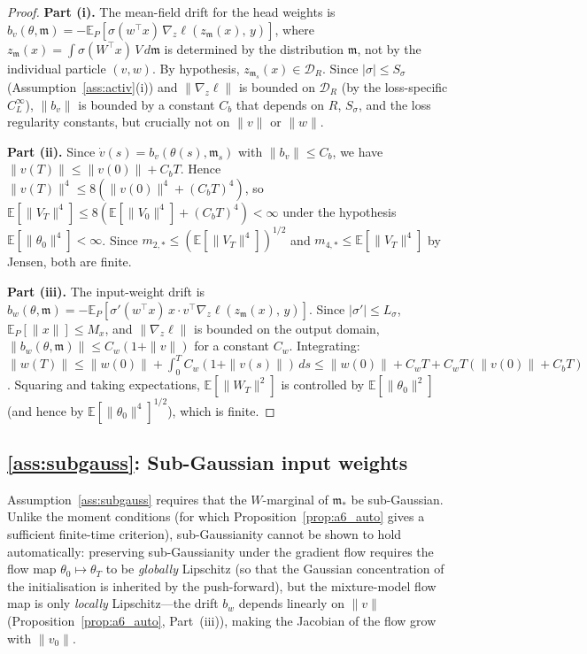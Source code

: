 \documentclass[11pt]{article}
\newcommand{\E}{\mathbb{E}}
\newcommand{\cB}{\mathcal{B}}
\newcommand{\cD}{\mathcal{D}}  %
\begin{document}
\begin{proof}
\textbf{Part (i).}
The mean-field drift for the head weights is
$b_v(\theta, \mathfrak{m})
= -\E_P[\sigma(w^\top x)\,\nabla_z \ell(z_\mathfrak{m}(x),\, y)]$,
where $z_\mathfrak{m}(x) = \int \sigma(W^\top x)\,V\,d\mathfrak{m}$
is determined by the distribution $\mathfrak{m}$, not by the
individual particle $(v,w)$.
By hypothesis, $z_{\mathfrak{m}_s}(x) \in \cD_R$.
Since $|\sigma| \le S_\sigma$ (Assumption~\ref{ass:activ}(i)) and
$\|\nabla_z \ell\|$ is bounded on $\cD_R$
(by the loss-specific $C_L^\infty$),
$\|b_v\|$ is bounded by a constant $C_b$ that depends on
$R$, $S_\sigma$, and the loss regularity constants, but crucially not on
$\|v\|$ or $\|w\|$.

\textbf{Part (ii).}
Since $\dot v(s) = b_v(\theta(s), \mathfrak{m}_s)$ with
$\|b_v\| \le C_b$, we have
$\|v(T)\| \le \|v(0)\| + C_b T$.
Hence
$\|v(T)\|^4 \le 8(\|v(0)\|^4 + (C_b T)^4)$, so
$\E[\|V_T\|^4] \le 8(\E[\|V_0\|^4] + (C_b T)^4) < \infty$
under the hypothesis $\E[\|\theta_0\|^4] < \infty$.
Since $m_{2,*} \le (\E[\|V_T\|^4])^{1/2}$ and
$m_{4,*} \le \E[\|V_T\|^4]$ by Jensen, both are finite.

\textbf{Part (iii).}
The input-weight drift is
$b_w(\theta, \mathfrak{m})
= -\E_P[\sigma'(w^\top x)\,x\cdot
  v^\top\nabla_z \ell(z_\mathfrak{m}(x),\,y)]$.
Since $|\sigma'| \le L_\sigma$, $\E_P[\|x\|] \le M_x$, and
$\|\nabla_z \ell\|$ is bounded on the output domain,
$\|b_w(\theta, \mathfrak{m})\| \le C_w(1 + \|v\|)$
for a constant $C_w$.
Integrating:
$\|w(T)\| \le \|w(0)\| + \int_0^T C_w(1 + \|v(s)\|)\,ds
\le \|w(0)\| + C_w T + C_w T(\|v(0)\| + C_b T)$.
Squaring and taking expectations,
$\E[\|W_T\|^2]$ is controlled by $\E[\|\theta_0\|^2]$
(and hence by $\E[\|\theta_0\|^4]^{1/2}$), which is finite.
\end{proof}

\subsection{\ref{ass:subgauss}: Sub-Gaussian input weights}\label{app:a7_validation}

Assumption~\ref{ass:subgauss} requires that the $W$-marginal of
$\mathfrak{m}_*$ be sub-Gaussian.
Unlike the moment conditions (for which
Proposition~\ref{prop:a6_auto} gives a sufficient finite-time
criterion),
sub-Gaussianity cannot be shown to hold automatically:
preserving sub-Gaussianity under the
gradient flow requires the flow map
$\theta_0 \mapsto \theta_T$ to be \emph{globally} Lipschitz
(so that the Gaussian concentration of the initialisation is inherited
by the push-forward), but the mixture-model flow map is only \emph{locally}
Lipschitz---the drift $b_w$ depends linearly on $\|v\|$
(Proposition~\ref{prop:a6_auto}, Part~(iii)),
making the Jacobian of the flow grow with $\|v_0\|$.
\end{document}
